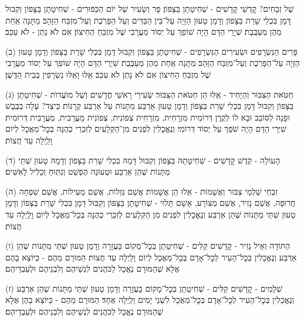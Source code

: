 %
שֶׁל זְבָחִים? קׇדְשֵׁי קׇדָשִׁים - שְׁחִיטָתָן בַּצָּפוֹן׃ פָּר וְשָׂעִיר שֶׁל יוֹם הַכִּפּוּרִים - שְׁחִיטָתָן בַּצָּפוֹן \middot וְקִבּוּל דָּמָן בִּכְלֵי שָׁרֵת בַּצָּפוֹן \middot וְדָמָן טָעוּן הַזָּיָה עַל־בֵּין הַבַּדִּים וְעַל הַפָּרֹֽכֶת וְעַל־מִזְבַּח הַזָּהָב׃ מַתָּנָה אַֽחַת מֵהֶן מְעַכֶּֽבֶת׃ שְׁיָרֵי הַדָּם הָיָה שׁוֹפֵךְ עַל יְסוֹד מַעֲרָבִי שֶׁל מִזְבֵּחַ הַחִיצוֹן׃ אִם לֹא נָתַן - לֹא עִכֵּב׃

(ב) פָּרִים הַנִּשְׂרָפִים וּשְׂעִירִים הַנִּשְׂרָפִים - שְׁחִיטָתָן בַּצָּפוֹן \middot וְקִבּוּל דָּמָן בִּכְלִי שָׁרֵת בַּצָּפוֹן \middot וְדָמָן טָעוּן הַזָּיָה עַל־הַפָּרֹֽכֶת וְעַל־מִזְבַּח הַזָּהָב׃ מַתָּנָה אַֽחַת מֵהֶן מְעַכֶּֽבֶת׃ שִׁיְרֵי הַדָּם הָיָה שׁוֹפֵךְ עַל יְסוֹד מַעֲרָבִי שֶׁל מִזְבֵּחַ הַחִיצוֹן אִם לֹא נָתַן לֹא עִכֵּב׃ אֵֽלּוּ וָאֵֽלּוּ נִשְׂרָפִין בְּבֵית הַדֶּֽשֶׁן׃

(ג) חַטֹּאת הַצִּבּוּר וְהַיָּחִיד - אֵֽלּוּ הֵן חַטֹּאת הַצִּבּוּר׃ שְׂעִירֵי רָאשֵׁי חֳדָשִׁים וְשֶׁל מוׁעֲדוׂת - שְׁחִיטָתָן בַּצָּפוֹן \middot וְקִבּוּל דָּמָן בִּכְלִי שָׁרֵת בַּצָּפוֹן \middot וְדָמָן טָעוּן אַרְבַּע מַתָּנוֹת עַל אַרְבַּע קְרָנוֹת׃ כֵּיצַד? עָלָה בַכֶּֽבֶשׁ \middot וּפָנָה לַסּוֹבֵב \middot וּבָא לוֹ לְקֶֽרֶן דְּרוֹמִית מִזְרָחִית, מִזְרָחִית צְפוֹנִית, צְפוֹנִית מַעֲרָבִית, מַעֲרָבִית דְּרוֹמִית׃ שִׁיְּרֵי הַדָּם הָיָה שֹׁפֵךְ עַל יְסוֹד דְּרוֹמִי׃ וְנֶאֱכָלִין לִפְנִים מִן־הַקְּלָעִים לְזִכְרֵי כְהֻנָּה בְּכׇל־מַאֲכָל לְיוֹם וָלַֽיְלָה עַד חֲצוֹת׃

(ד) הָעוֹלָה - קֹֽדֶשׁ קׇדָשִׁים - שְׁחִיטָתָהּ בַּצָּפוֹן \middot וְקִבּוּל דָּמָהּ בִּכְלִי שָׁרֵת בַּצָּפוֹן \middot וְדָמָהּ טָעוּן שְׁתֵּי מַתָּנוֹת שֶׁהֵן אַרְבַּע \middot וּטְעוּנָה הֶפְשֵׁט וְנִתּֽוּחַ וְכָלִיל לָאִשִּׁים׃

(ה) זִבְחֵי שַׁלְמֵי צִבּוּר וַאֲשָׁמוֹת - אֵֽלוּ הֵן אֲשָׁמוֹת׃ אֲשַׁם גְּזֵלוֹת, אֲשַׁם מְעִילוֹת, אֲשַׁם שִׁפְחָה חֲרוּפָה, אֲשַׁם נָזִיר, אֲשַׁם מְצוֹרָע, אָשָׁם תָּלוּי - שְׁחִיטָתָן בַּצָּפוֹן \middot וְקִבּוּל דָּמָן בִּכְלִי שָׁרֵת בַּצָּפוֹן \middot וְדָמָן טָעוּן שְׁתֵּי מַתָּנוֹת שֶׁהֵן אַרְבַּע \middot וְנֶאֱכָלִין לִפְנִים מִן הַקְּלָעִים לְזִכְרֵי כְהֻנָּה בְּכׇל־מַאֲכָל לְיוֹם וָלַֽיְלָה עַד חֲצוֹת׃

(ו) הַתּוֹדָה וְאֵיל נָזִיר - קׇדָשִׁים קַלִּים - שְׁחִיטָתָן בְּכׇל־מָקוֹם בָּעֲזָרָה \middot וְדָמָן טָעוּן שְׁתֵּי מַתָּנוֹת שֶׁהֵן אַרְבַּע \middot וְנֶאֱכָלִין בְּכׇל־הָעִיר לְכׇל־אָדָם בְּכׇל־מַאֲכָל לְיוֹם וָלַֽיְלָה עַד חֲצוֹת׃ הַמּוּרָם מֵהֶם - כַּיּוֹצֵא בָהֶם \middot אֶלָּא שֶׁהַמּוּרָם נֶאֱכָל לַכֹּהֲנִים לִנְשֵׁיהֶם וְלִבְנֵיהֶם וּלְעַבְדֵיהֶם׃

(ז) שְׁלָמִים - קׇדָשִׁים קַלִּים - שְׁחִיטָתָן בְּכׇל־מָקוֹם בָּעֲזָרָה \middot וְדָמָן טָעוּן שְׁתֵּי מַתָּנוֹת שֶׁהֵן אַרְבַּע \middot וְנֶאֱכָלִין בְּכׇל־הָעִיר לְכׇל־אָדָם בְּכׇל־מַאֲכָל לִשְׁנֵי יָמִים וְלַֽיְלָה אֶחָד׃ הַמּוּרָם מֵהֶם - כַּיּוֹצֵא בָהֶן \middot אֶלָּא שֶׁהַמּוּרָם נֶאֱכָל לַכֹּהֲנִים לִנְשֵׁיהֶם וְלִבְנֵיהֶם וּלְעַבְדֵיהֶם׃

